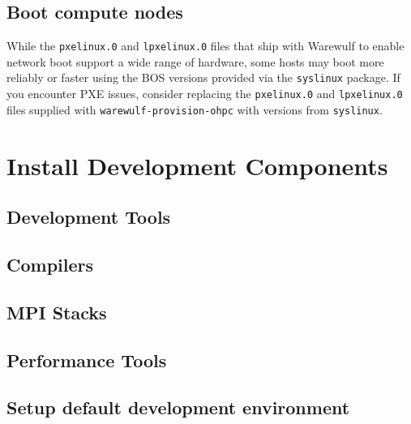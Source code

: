 \documentclass[letterpaper]{article}
\begin{document}
\subsection{Boot compute nodes} \label{sec:boot_computes}



\begin{center}
\begin{tcolorbox}[]
\small While the \texttt{pxelinux.0} and \texttt{lpxelinux.0} files that ship
with Warewulf to enable network boot support a wide range of hardware, some
hosts may boot more reliably or faster using the BOS versions provided via the
\texttt{syslinux} package. If you encounter PXE issues, consider
replacing the \texttt{pxelinux.0} and \texttt{lpxelinux.0} files supplied with
\texttt{warewulf-provision-ohpc} with versions from \texttt{syslinux}.
\end{tcolorbox}
\end{center}

\section{Install \OHPC{} Development Components}


\subsection{Development Tools} \label{sec:install_dev_tools}


\subsection{Compilers} \label{sec:install_compilers}


\subsection{MPI Stacks} \label{sec:mpi}


\subsection{Performance Tools} \label{sec:install_perf_tools}


\subsection{Setup default development environment}

\end{document}
